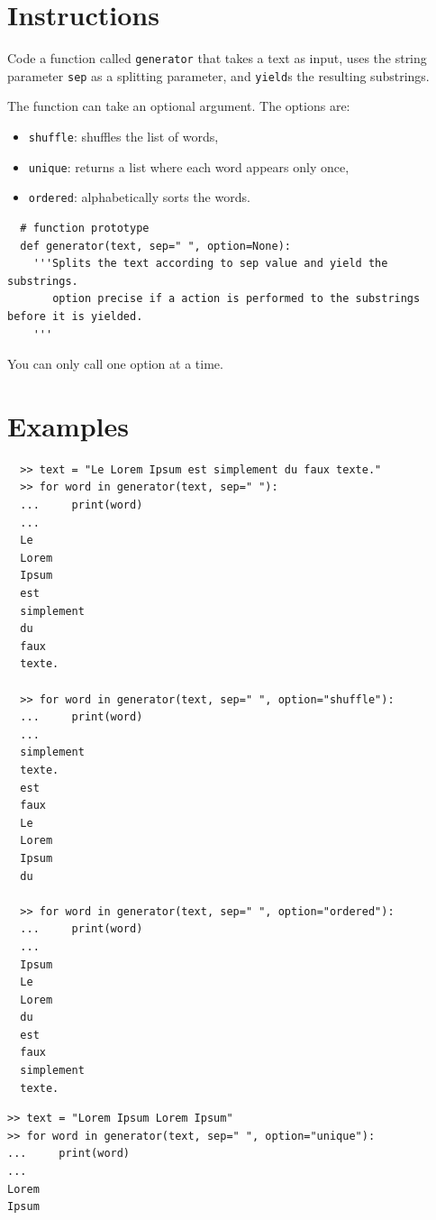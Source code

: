 \documentclass{42-en}
\begin{document}
\section*{Instructions}
Code a function called \texttt{generator} that takes a text as input, uses the string
parameter \texttt{sep} as a splitting parameter, and \texttt{yield}s the resulting substrings.

The function can take an optional argument.
The options are:
\begin{itemize}
  \item \texttt{shuffle}: shuffles the list of words,
  \item \texttt{unique}: returns a list where each word appears only once,
  \item \texttt{ordered}: alphabetically sorts the words.
\end{itemize}

\begin{verbatim}
  # function prototype
  def generator(text, sep=" ", option=None):
    '''Splits the text according to sep value and yield the substrings.
       option precise if a action is performed to the substrings before it is yielded.
    '''
\end{verbatim}

You can only call one option at a time.

\section*{Examples}
\begin{verbatim}
  >> text = "Le Lorem Ipsum est simplement du faux texte."
  >> for word in generator(text, sep=" "):
  ...     print(word)
  ...
  Le
  Lorem
  Ipsum
  est
  simplement
  du
  faux
  texte.

  >> for word in generator(text, sep=" ", option="shuffle"):
  ...     print(word)
  ...
  simplement
  texte.
  est
  faux
  Le
  Lorem
  Ipsum
  du
  
  >> for word in generator(text, sep=" ", option="ordered"):
  ...     print(word)
  ...
  Ipsum
  Le
  Lorem
  du
  est
  faux
  simplement
  texte.
\end{verbatim}

\begin{verbatim}
>> text = "Lorem Ipsum Lorem Ipsum"
>> for word in generator(text, sep=" ", option="unique"):
...     print(word)
...
Lorem
Ipsum
\end{verbatim}
\end{document}
